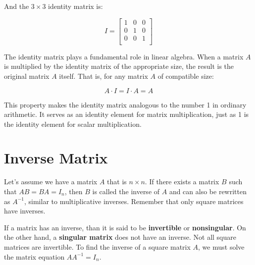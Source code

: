 \documentclass[11pt]{article}
\begin{document}
And the $3 \times 3$ identity matrix is:

\[
I = \begin{bmatrix}
1 & 0 & 0 \\
0 & 1 & 0 \\
0 & 0 & 1 \\
\end{bmatrix}
\]

The identity matrix plays a fundamental role in linear algebra. When a matrix $A$ is multiplied by the identity matrix of the appropriate size, the result is the original matrix $A$ itself. That is, for any matrix $A$ of compatible size:

\[
A \cdot I = I \cdot A = A
\]

This property makes the identity matrix analogous to the number 1 in ordinary arithmetic. It serves as an identity element for matrix multiplication, just as 1 is the identity element for scalar multiplication.

\section{Inverse Matrix}

Let's assume we have a matrix $A$ that is $n\times n$. If there exists a matrix $B$ such that $AB = BA = I_n$, then $B$ is called the inverse of $A$ and can also be rewritten as $A^{-1}$, similar to multiplicative inverses. Remember that only square matrices have inverses.

If a matrix has an inverse, than it is said to be \textbf{invertible} or \textbf{nonsingular}. On the other hand, a \textbf{singular matrix} does not have an inverse. Not all square matrices are invertible. To find the inverse of a square matrix $A$, we must solve the matrix equation $AA^{-1} = I_n$. 
\end{document}
